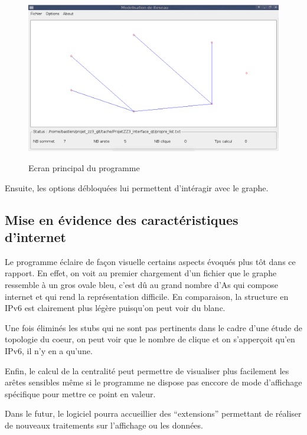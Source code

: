 \begin{figure}[H]
\centering
 \fbox
 {
 \includegraphics[width=16cm]{./schema/capture_ecran_graph.png}
 }
  \caption{\label{ecran_graph}Ecran principal du programme}
\end{figure}

\par
Ensuite, les options d\'ebloqu\'ees lui permettent d'int\'eragir avec le graphe.

\subsection{Mise en évidence des caractéristiques d'internet}
\par
Le programme \'eclaire de fa\c con visuelle certains aspects \'evoqu\'es plus t\^ot dans ce rapport. En effet, on voit au premier chargement d'un fichier que le graphe ressemble \`a un gros ovale bleu, c'est d\^u au grand nombre d'As qui compose internet et qui rend la repr\'esentation difficile. En comparaison, la structure en IPv6 est clairement plus l\'eg\`ere puisqu'on peut voir du blanc.
\par
Une fois \'elimin\'es les stubs qui ne sont pas pertinents dans le cadre d'une \'etude de topologie du coeur, on peut voir que le nombre de clique et on s'apper\c coit qu'en IPv6, il n'y en a qu'une.
\par
Enfin, le calcul de la centralit\'e peut permettre de visualiser plus facilement les ar\^etes sensibles m\^eme si le programme ne dispose pas enccore de mode d'affichage sp\'ecifique pour mettre ce point en valeur.
\par
Dans le futur, le logiciel pourra accueillier des ``extensions'' permettant de réaliser de nouveaux traitements sur l'affichage ou les données.